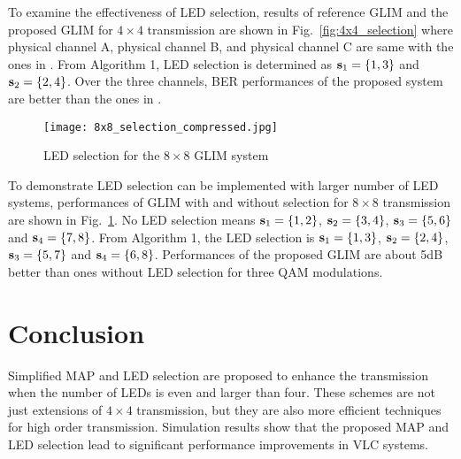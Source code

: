 \documentclass[12pt,letterpaper]{IEEEtran}
\begin{document}
To examine the effectiveness of LED selection, results of reference GLIM \cite{yesilkaya_optical_2017} and the proposed GLIM for $4 \times 4$ transmission are shown in Fig.~\ref{fig:4x4_selection} where physical channel A, physical channel B, and physical channel C are same with the ones in \cite{yesilkaya_optical_2017}. From Algorithm 1, LED selection is determined as ${\bold s}_1 =\{1, 3\}$ and ${\bold s}_2 =\{2, 4\}$. Over the three channels, BER performances of the proposed system are better than the ones in \cite{yesilkaya_optical_2017}.\\
\begin{figure}[h] 
	\centering
	\texttt{[image: 8x8\_selection\_compressed.jpg]}
	\caption{LED selection for the $8 \times 8$ GLIM system}
	\label{Fig:8x8_selection}
\end{figure}
To demonstrate LED selection can be implemented with larger number of LED systems, performances of GLIM with and without selection for $8 \times 8$ transmission are shown in Fig.~\ref{Fig:8x8_selection}. No LED selection means ${\bold s}_1 =\{1, 2\}$, ${\bold s}_2 =\{3, 4\}$, ${\bold s}_3 =\{5, 6\}$ and ${\bold s}_4 =\{7, 8\}$. From Algorithm 1, the LED selection is ${\bold s}_1 =\{1, 3\}$, ${\bold s}_2 =\{2, 4\}$, ${\bold s}_3 =\{5, 7\}$ and ${\bold s}_4 =\{6, 8\}$. Performances of the proposed GLIM are about 5dB better than ones without LED selection for three QAM modulations.
\section{Conclusion}
Simplified MAP and LED selection are proposed to enhance the transmission when the number of LEDs is even and larger than four. These schemes are not just extensions of $4 \times 4$ transmission, but they are also more efficient techniques for high order transmission. Simulation results show that the proposed MAP and LED selection lead to significant performance improvements in VLC systems.
\ifCLASSOPTIONcaptionsoff
\newpage
\fi
\renewcommand*{\bibfont}{\footnotesize}
\printbibliography
\end{document}
